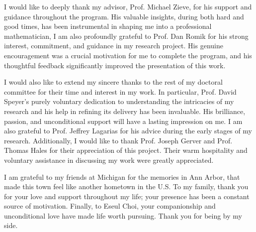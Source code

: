 I would like to deeply thank my advisor, Prof. Michael Zieve,
for his support and guidance throughout the program.
His valuable insights, during both hard and good times,
has been instrumental in shaping me into a professional mathematician,
I am also profoundly grateful to Prof. Dan Romik for his strong interest, commitment, and guidance in my research project.
His genuine encouragement was a crucial motivation for me to complete the program,
and his thoughtful feedback significantly improved the presentation of this work.

I would also like to extend my sincere thanks to the rest of my doctoral committee for their time and interest in my work.
In particular, Prof. David Speyer's purely voluntary dedication to understanding the intricacies of my research and 
his help in refining its delivery has been invaluable.
His brilliance, passion, and unconditional support will have a lasting impression on me.
I am also grateful to Prof. Jeffrey Lagarias for his advice during the early stages of my research. 
Additionally, I would like to thank Prof. Joseph Gerver and Prof. Thomas Hales for their appreciation of this project.
Their warm hospitality and voluntary assistance in discussing my work were greatly appreciated.

I am grateful to my friends at Michigan for the memories in Ann Arbor,
that made this town feel like another hometown in the U.S.
To my family, thank you for your love and support throughout my life;
your presence has been a constant source of motivation.
Finally, to Eseul Choi, your companionship and unconditional love have made life worth pursuing.
Thank you for being by my side.